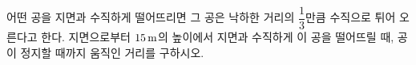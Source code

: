 어떤 공을 지면과 수직하게 떨어뜨리면 그 공은 낙하한 거리의 $\dfrac{1}{3}$만큼 수직으로 튀어 오른다고 한다. 지면으로부터 $15\mkern3mu \mathrm{m}$의 높이에서 지면과 수직하게 이 공을 떨어뜨릴 때, 공이 정지할 때까지 움직인 거리를 구하시오.
